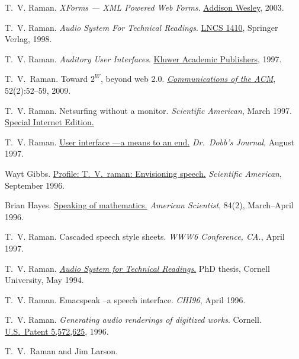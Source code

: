 \documentclass{article}
\begin{document}
\begin{compactitem}{}
\item  T.~V. Raman.  
 {\em XForms --- XML Powered Web Forms}.
 \href{http://www.amazon.com/exec/obidos/ASIN/0321154991}%
{Addison Wesley},  2003.
\item  T.~V. Raman.  
 {\em Audio System For Technical Readings}.  
\href{http://link.springer-ny.com/link/service/series/0558/tocs/t1410.htm}%
{LNCS 1410}, Springer Verlag,  1998.
\item  T.~V. Raman.  
 {\em Auditory User Interfaces}.
 \href{http://www.cs.cornell.edu/home/raman/aui/aui.html}%
 {Kluwer Academic Publishers},  1997.
 \item T.~V.~Raman.
 Toward $2^W$, beyond web 2.0.
 \href{http://emacspeak.sourceforge.net/raman/publications/beyond-web20-cacm-2009/}{\em Communications of the ACM}, 52(2):52--59, 2009.
\item   T.~V. Raman.  
 Netsurfing without a monitor.  
 {\em Scientific American}, March 1997.
 \href{http://www.sciam.com/0397issue/0397raman.html}%
{Special Internet Edition.}
\item   T.~V.  Raman.  
\href{http://www.drdobbs.com/user-interface-a-means-to-an-end/184410453}%
{User interface ---a means to an end.}  
 {\em Dr.\ 
  Dobb's Journal}, August 1997.
\item   Wayt Gibbs.  
\href{http://www.sciam.com/0996issue/0996profile.html}%
{Profile: T.\ V.\ raman: Envisioning speech.}  
 {\em
  Scientific American}, September 1996.
\item   Brian Hayes.
  \href{http://www.amsci.org/amsci/issues/Comsci96/compsci96-03.html}%
{Speaking of mathematics.}  
 {\em American Scientist},
84(2), March--April 1996.
\item   T.~V. Raman.  
 Cascaded speech
  style sheets.  
 {\em WWW6 Conference, CA.}, April
  1997.
\item   T.~V.  Raman.  
\href{http://www.cs.cornell.edu/home/raman/aster/aster-toplevel.html}%
{{\em Audio System for Technical Readings}.}  
 PhD
thesis, Cornell University, May 1994.
\item   T.~V.  Raman.  
 Emacspeak --a
  speech interface.  
 {\em CHI96}, April 1996.
\item  T.~V. Raman.  
  \emph{Generating audio renderings of digitized works}.
 Cornell.
 \href{http://patft.uspto.gov/netacgi/nph-Parser?TERM1=5,572,625&Sect1=PTO1&Sect2=HITOFF&d=PALL&p=1&u=\%2Fnetahtml\%2Fsrchnum.htm&r=0&f=S&l=50}%
{U.S.\ Patent 5,572,625},  1996.
\item  T.\ V.\ Raman and Jim Larson.

\end{compactitem}
\end{document}
